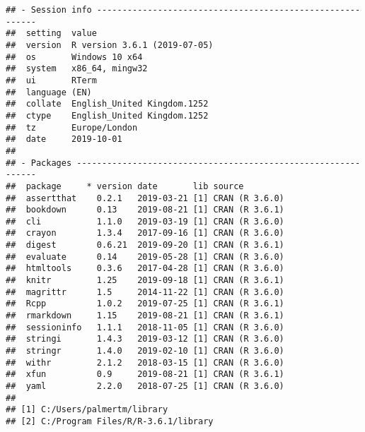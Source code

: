 \documentclass[10pt,]{book}
\begin{document}
\begin{verbatim}
## - Session info ----------------------------------------------------------
##  setting  value                       
##  version  R version 3.6.1 (2019-07-05)
##  os       Windows 10 x64              
##  system   x86_64, mingw32             
##  ui       RTerm                       
##  language (EN)                        
##  collate  English_United Kingdom.1252 
##  ctype    English_United Kingdom.1252 
##  tz       Europe/London               
##  date     2019-10-01                  
## 
## - Packages --------------------------------------------------------------
##  package     * version date       lib source        
##  assertthat    0.2.1   2019-03-21 [1] CRAN (R 3.6.0)
##  bookdown      0.13    2019-08-21 [1] CRAN (R 3.6.1)
##  cli           1.1.0   2019-03-19 [1] CRAN (R 3.6.0)
##  crayon        1.3.4   2017-09-16 [1] CRAN (R 3.6.0)
##  digest        0.6.21  2019-09-20 [1] CRAN (R 3.6.1)
##  evaluate      0.14    2019-05-28 [1] CRAN (R 3.6.0)
##  htmltools     0.3.6   2017-04-28 [1] CRAN (R 3.6.0)
##  knitr         1.25    2019-09-18 [1] CRAN (R 3.6.1)
##  magrittr      1.5     2014-11-22 [1] CRAN (R 3.6.0)
##  Rcpp          1.0.2   2019-07-25 [1] CRAN (R 3.6.1)
##  rmarkdown     1.15    2019-08-21 [1] CRAN (R 3.6.1)
##  sessioninfo   1.1.1   2018-11-05 [1] CRAN (R 3.6.0)
##  stringi       1.4.3   2019-03-12 [1] CRAN (R 3.6.0)
##  stringr       1.4.0   2019-02-10 [1] CRAN (R 3.6.0)
##  withr         2.1.2   2018-03-15 [1] CRAN (R 3.6.0)
##  xfun          0.9     2019-08-21 [1] CRAN (R 3.6.1)
##  yaml          2.2.0   2018-07-25 [1] CRAN (R 3.6.0)
## 
## [1] C:/Users/palmertm/library
## [2] C:/Program Files/R/R-3.6.1/library
\end{verbatim}

\backmatter
\end{document}
